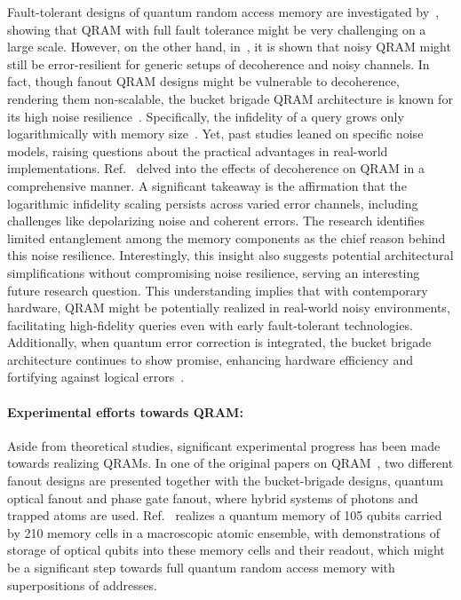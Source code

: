 Fault-tolerant designs of quantum random access memory are investigated by~\cite{di2020fault}, showing that QRAM with full fault tolerance might be very challenging on a large scale. However, on the other hand, in~\cite{hann2021resilience}, it is shown that noisy QRAM might still be error-resilient for generic setups of decoherence and noisy channels. In fact, though fanout QRAM designs might be vulnerable to decoherence, rendering them non-scalable, the bucket brigade QRAM architecture is known for its high noise resilience~\cite{giovannetti2008quantum, hann2021resilience}. Specifically, the infidelity of a query grows only logarithmically with memory size~\cite{hann2021resilience}. Yet, past studies leaned on specific noise models, raising questions about the practical advantages in real-world implementations. Ref.~\cite{hann2021resilience} delved into the effects of decoherence on QRAM in a comprehensive manner. A significant takeaway is the affirmation that the logarithmic infidelity scaling persists across varied error channels, including challenges like depolarizing noise and coherent errors. The research identifies limited entanglement among the memory components as the chief reason behind this noise resilience. Interestingly, this insight also suggests potential architectural simplifications without compromising noise resilience, serving an interesting future research question. This understanding implies that with contemporary hardware, QRAM might be potentially realized in real-world noisy environments, facilitating high-fidelity queries even with early fault-tolerant technologies. Additionally, when quantum error correction is integrated, the bucket brigade architecture continues to show promise, enhancing hardware efficiency and fortifying against logical errors~\cite{giovannetti2008quantum, hann2021resilience}.


\paragraph{Experimental efforts towards QRAM: }
Aside from theoretical studies, significant experimental progress has been made towards realizing QRAMs. In one of the original papers on QRAM~\cite{giovannetti2008architectures}, two different fanout designs are presented together with the bucket-brigade designs, quantum optical fanout and phase gate fanout, where hybrid systems of photons and trapped atoms are used. Ref.~\cite{jiang2019experimental} realizes a quantum memory of 105 qubits carried by 210 memory cells in a macroscopic atomic ensemble, with demonstrations of storage of optical qubits into these memory cells and their readout, which might be a significant step towards full quantum random access memory with superpositions of addresses.

